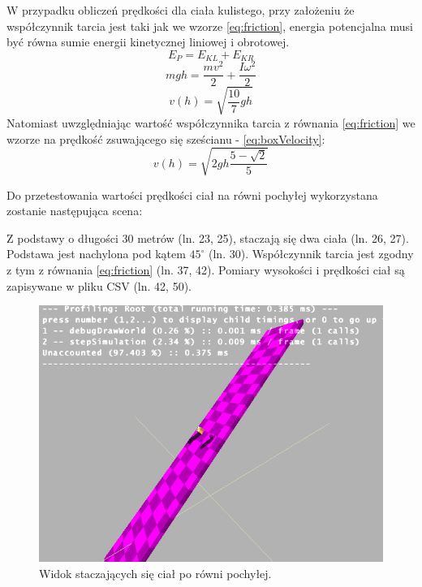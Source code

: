 W przypadku obliczeń prędkości dla ciała kulistego, przy założeniu że
współczynnik tarcia jest taki jak we wzorze \ref{eq:friction}, energia
potencjalna musi być równa sumie energii kinetycznej liniowej i obrotowej.
\begin{equation}
E_{P} = E_{KL} + E_{KR}
\end{equation}
\begin{equation}
mgh = \frac{mv^{2}}{2} + \frac{I\omega^{2}}{2}
\end{equation}
\begin{equation}
v(h) = \sqrt{\frac{10}{7}gh}
\label{eq:ballVelocity}
\end{equation}
Natomiast uwzględniając wartość współczynnika tarcia z równania
\ref{eq:friction} we wzorze na prędkość zsuwającego się sześcianu -
\ref{eq:boxVelocity}:
\begin{equation}
v(h) = \sqrt{2gh\frac{5-\sqrt{2}}{5}}
\label{eq:ballVelocity2}
\end{equation}

Do przetestowania wartości prędkości ciał na równi pochyłej wykorzystana
zostanie następująca scena:



Z podstawy o długości 30 metrów (ln. 23, 25), staczają się dwa ciała (ln. 26, 
27). Podstawa jest nachylona pod kątem $ 45^{\circ} $ (ln. 30). Współczynnik
tarcia jest zgodny z tym z równania \ref{eq:friction} (ln. 37, 42). Pomiary
wysokości i prędkości ciał są zapisywane w pliku CSV (ln. 42, 50).

\begin{figure}
\centering
\includegraphics[scale=0.5]{./img/rowniaScreen.PNG}
\caption{Widok staczających się ciał po równi pochyłej.}
\label{fig:rowniaScreen}
\end{figure}

